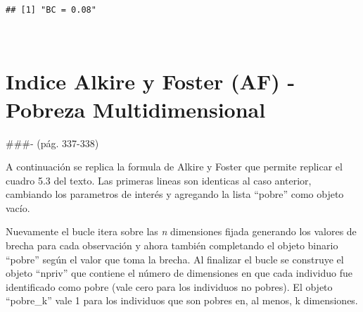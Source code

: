 \documentclass[
]{book}
\newenvironment{Shaded}{\begin{snugshade}}{\end{snugshade}}
\newcommand{\CommentTok}[1]{\textcolor[rgb]{0.56,0.35,0.01}{\textit{#1}}}
\newcommand{\DecValTok}[1]{\textcolor[rgb]{0.00,0.00,0.81}{#1}}
\newcommand{\FloatTok}[1]{\textcolor[rgb]{0.00,0.00,0.81}{#1}}
\newcommand{\FunctionTok}[1]{\textcolor[rgb]{0.00,0.00,0.00}{#1}}
\newcommand{\NormalTok}[1]{#1}
\newcommand{\OtherTok}[1]{\textcolor[rgb]{0.56,0.35,0.01}{#1}}
\newcommand{\SpecialCharTok}[1]{\textcolor[rgb]{0.00,0.00,0.00}{#1}}
\begin{document}
\begin{verbatim}
## [1] "BC = 0.08"
\end{verbatim}

~

\hypertarget{indice-alkire-y-foster-af---pobreza-multidimensional}{%
\section{Indice Alkire y Foster (AF) - Pobreza Multidimensional}\label{indice-alkire-y-foster-af---pobreza-multidimensional}}

\#\#\#- (pág. 337-338)

A continuación se replica la formula de Alkire y Foster que permite replicar el cuadro 5.3 del texto. Las primeras lineas son identicas al caso anterior, cambiando los parametros de interés y agregando la lista ``pobre'' como objeto vacío.

\begin{Shaded}
\end{Shaded}

Nuevamente el bucle itera sobre las \emph{n} dimensiones fijada generando los valores de brecha para cada observación y ahora también completando el objeto binario ``pobre'' según el valor que toma la brecha. Al finalizar el bucle se construye el objeto ``npriv'' que contiene el número de dimensiones en que cada individuo fue identificado como pobre (vale cero para los individuos no pobres). El objeto ``pobre\_k'' vale 1 para los individuos que son pobres en, al menos, k dimensiones.
\end{document}
